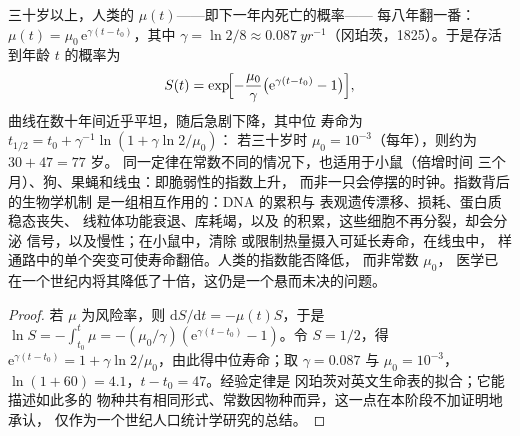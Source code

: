\begin{proposition}[冈珀茨定律]\label{prop:b3:stem-cells:gompertz}
三十岁以上，人类的 $\mu(t)$——即下一年内死亡的概率——
每八年翻一番：$\mu(t) =
\mu_{0}\,\mathrm{e}^{\gamma(t - t_{0})}$，其中 $\gamma = \ln 2/8 \approx
\qty{0.087}{yr^{-1}}$（冈珀茨，1825）。于是存活到年龄 $t$ 的概率为
\[
S(t) = \exp\!\Bigl[-\frac{\mu_{0}}{\gamma}\bigl(\mathrm{e}^{\gamma(t - t_{0})} - 1\bigr)\Bigr],
\]
曲线在数十年间近乎平坦，随后急剧下降，其中位
寿命为 $t_{1/2} = t_{0} + \gamma^{-1}\ln(1 + \gamma\ln 2/\mu_{0})$：
若三十岁时 $\mu_{0} = 10^{-3}$（每年），则约为 $30 + 47 = 77$ 岁。
同一定律在常数不同的情况下，也适用于小鼠（倍增时间
三个月）、狗、果蝇和线虫：即脆弱性的指数上升，
而非一只会停摆的时钟。指数背后的生物学机制
是一组相互作用的\emph{}：DNA 的累积与
表观遗传漂移、损耗、蛋白质稳态丧失、
线粒体功能衰退、库耗竭，以及
\emph{}的积累，这些细胞不再分裂，却会分泌
信号，以及慢性；在小鼠中，清除
或限制热量摄入可延长寿命，在线虫中，
样通路中的单个突变可使寿命翻倍。人类的指数能否降低，
而非常数 $\mu_{0}$，
医学已在一个世纪内将其降低了十倍，这仍是一个悬而未决的问题。
\end{proposition}
\begin{proof}
若 $\mu$ 为风险率，则 $\mathrm{d}S/\mathrm{d}t = -\mu(t)S$，于是 $\ln S =
-\int_{t_{0}}^{t}\mu = -(\mu_{0}/\gamma)(\mathrm{e}^{\gamma(t-t_{0})} -
1)$。令 $S = 1/2$，得 $\mathrm{e}^{\gamma(t-t_{0})} = 1 + \gamma\ln 2/
\mu_{0}$，由此得中位寿命；取 $\gamma = 0.087$ 与 $\mu_{0} =
10^{-3}$，$\ln(1 + 60) = 4.1$，$t - t_{0} = 47$。经验定律是
冈珀茨对英文生命表的拟合；它能描述如此多的
物种共有相同形式、常数因物种而异，这一点在本阶段不加证明地承认，
仅作为一个世纪人口统计学研究的总结。
\end{proof}

